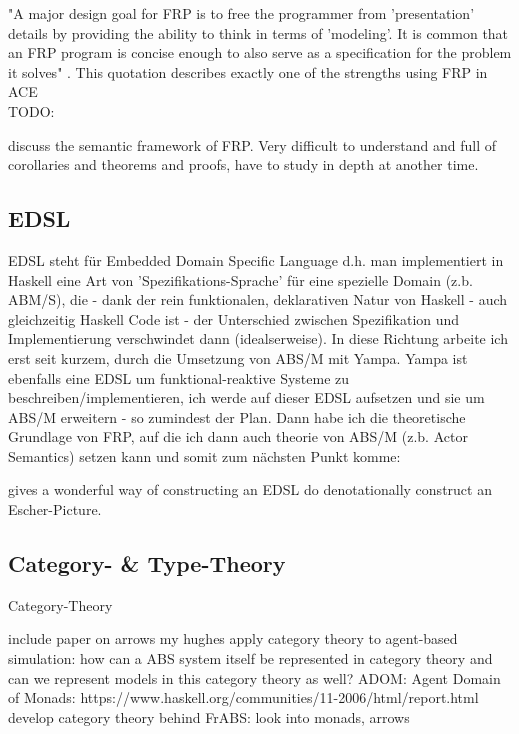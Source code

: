 "A major design goal for FRP is to free the programmer from 'presentation' details by providing the ability to think in terms of 'modeling'. It is common that an FRP program is concise enough to also serve as a specification for the problem it solves" \cite{Wan2000}. This quotation describes exactly one of the strengths using FRP in ACE \\

TODO: \cite{perez_functional_2016}

\cite{Wan2000} discuss the semantic framework of FRP. Very difficult to understand and full of corollaries and theorems and proofs, have to study in depth at another time.


\subsection{EDSL}
EDSL steht für Embedded Domain Specific Language d.h. man implementiert in Haskell eine Art von 'Spezifikations-Sprache' für eine spezielle Domain (z.b. ABM/S), die - dank der rein funktionalen, deklarativen Natur von Haskell - auch gleichzeitig Haskell Code ist - der Unterschied zwischen Spezifikation und Implementierung verschwindet dann (idealserweise). In diese Richtung arbeite ich erst seit kurzem, durch die Umsetzung von ABS/M mit Yampa. Yampa ist ebenfalls eine EDSL um funktional-reaktive Systeme zu beschreiben/implementieren, ich werde auf dieser EDSL aufsetzen und sie um ABS/M erweitern - so zumindest der Plan. Dann habe ich die theoretische Grundlage von FRP, auf die ich dann auch theorie von ABS/M (z.b. Actor Semantics) setzen kann und somit zum nächsten Punkt komme:

\cite{Henderson1982} gives a wonderful way of constructing an EDSL do denotationally construct an Escher-Picture.

\subsection{Category- \& Type-Theory}
Category-Theory \cite{Pierce1991} \cite{spivak_category_2014}

include paper on arrows my hughes
apply category theory to agent-based simulation: how can a ABS system itself be represented in category theory and can we represent models in this category theory as well?
ADOM: Agent Domain of Monads: https://www.haskell.org/communities/11-2006/html/report.html
develop category theory behind FrABS: look into monads, arrows

